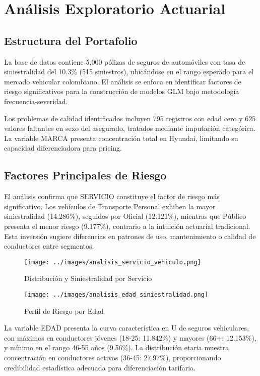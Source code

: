 \section{Análisis Exploratorio Actuarial}

\subsection{Estructura del Portafolio}

La base de datos contiene 5,000 pólizas de seguros de automóviles con tasa de siniestralidad del 10.3\% (515 siniestros), ubicándose en el rango esperado para el mercado vehicular colombiano. El análisis se enfoca en identificar factores de riesgo significativos para la construcción de modelos GLM bajo metodología frecuencia-severidad.

Los problemas de calidad identificados incluyen 795 registros con edad cero y 625 valores faltantes en sexo del asegurado, tratados mediante imputación categórica. La variable MARCA presenta concentración total en Hyundai, limitando su capacidad diferenciadora para pricing.

\subsection{Factores Principales de Riesgo}

El análisis confirma que SERVICIO constituye el factor de riesgo más significativo. Los vehículos de Transporte Personal exhiben la mayor siniestralidad (14.286\%), seguidos por Oficial (12.121\%), mientras que Público presenta el menor riesgo (9.177\%), contrario a la intuición actuarial tradicional. Esta inversión sugiere diferencias en patrones de uso, mantenimiento o calidad de conductores entre segmentos.

\begin{figure}[H]
\centering
\begin{minipage}{0.48\textwidth}
\centering
\texttt{[image: ../images/analisis\_servicio\_vehiculo.png]}
\caption{Distribución y Siniestralidad por Servicio}
\end{minipage}
\hfill
\begin{minipage}{0.48\textwidth}
\centering
\texttt{[image: ../images/analisis\_edad\_siniestralidad.png]}
\caption{Perfil de Riesgo por Edad}
\end{minipage}
\end{figure}

La variable EDAD presenta la curva característica en U de seguros vehiculares, con máximos en conductores jóvenes (18-25: 11.842\%) y mayores (66+: 12.153\%), y mínimo en el rango 46-55 años (9.56\%). La distribución etaria muestra concentración en conductores activos (36-45: 27.97\%), proporcionando credibilidad estadística adecuada para diferenciación tarifaria.

